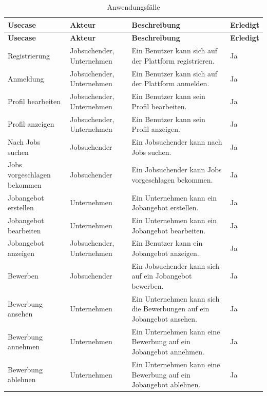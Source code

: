 \documentclass[12pt, letterpaper]{article}
\begin{document}
    \begin{longtable}[htbp]{|p{}|p{}|p{}|p{}|}
       
        \hline
        \textbf{Usecase}&\textbf{Akteur}&\textbf{Beschreibung}&\textbf{Erledigt}\\
        \hline
        \hline
        \endfirsthead

        \hline
        \textbf{Usecase}&\textbf{Akteur}&\textbf{Beschreibung}&\textbf{Erledigt}\\
        \hline
        \hline
        \endhead

        \hline
        \endfoot

        \hline
        \caption{Anwendungsfälle}  \label{tab:Anwendungsfaelle} 
        \endlastfoot
        Registrierung& Jobsuchender, Unternehmen & Ein Benutzer kann sich auf der Plattform registrieren. & Ja \\
        \hline
        Anmeldung& Jobsuchender, Unternehmen & Ein Benutzer kann sich auf der Plattform anmelden. & Ja \\
        \hline
        Profil bearbeiten& Jobsuchender, Unternehmen & Ein Benutzer kann sein Profil bearbeiten. & Ja \\
        \hline
        Profil anzeigen& Jobsuchender, Unternehmen & Ein Benutzer kann sein Profil anzeigen. & Ja \\
        \hline
        Nach Jobs suchen& Jobsuchender & Ein Jobsuchender kann nach Jobs suchen. & Ja \\
        \hline
        Jobs vorgeschlagen bekommen& Jobsuchender & Ein Jobsuchender kann Jobs vorgeschlagen bekommen. & Ja \\
        \hline
        Jobangebot erstellen& Unternehmen & Ein Unternehmen kann ein Jobangebot erstellen. & Ja \\
        \hline
        Jobangebot bearbeiten& Unternehmen & Ein Unternehmen kann ein Jobangebot bearbeiten. & Ja \\
        \hline
        Jobangebot anzeigen& Jobsuchender, Unternehmen & Ein Benutzer kann ein Jobangebot anzeigen. & Ja \\
        \hline
        Bewerben& Jobsuchender & Ein Jobsuchender kann sich auf ein Jobangebot bewerben. & Ja \\
        \hline
        Bewerbung ansehen& Unternehmen & Ein Unternehmen kann sich die Bewerbungen auf ein Jobangebot ansehen. & Ja \\
        \hline
        Bewerbung annehmen& Unternehmen & Ein Unternehmen kann eine Bewerbung auf ein Jobangebot annehmen. & Ja \\
        \hline
        Bewerbung ablehnen& Unternehmen & Ein Unternehmen kann eine Bewerbung auf ein Jobangebot ablehnen. & Ja \\
    \end{longtable}
\end{document}
